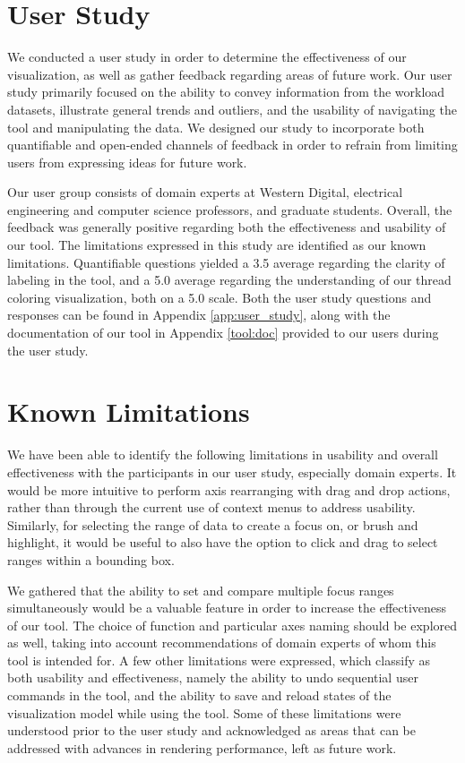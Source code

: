 \documentclass[12pt]{ucthesis}
\begin{document}
\section{User Study}
We conducted a user study in order to determine the effectiveness of our visualization, as well as gather feedback regarding areas of future work. Our user study primarily focused on the ability to convey information from the workload datasets, illustrate general trends and outliers, and the usability of navigating the tool and manipulating the data. We designed our study to incorporate both quantifiable and open-ended channels of feedback in order to refrain from limiting users from expressing ideas for future work.

Our user group consists of domain experts at Western Digital, electrical engineering and computer science professors, and graduate students. Overall, the feedback was generally positive regarding both the effectiveness and usability of our tool. The limitations expressed in this study are identified as our known limitations. Quantifiable questions yielded a 3.5 average regarding the clarity of labeling in the tool, and a 5.0 average regarding the understanding of our thread coloring visualization, both on a 5.0 scale. Both the user study questions and responses can be found in Appendix \ref{app:user_study}, along with the documentation of our tool in Appendix \ref{tool:doc} provided to our users during the user study.

\section{Known Limitations}
We have been able to identify the following limitations in usability and overall effectiveness with the participants in our user study, especially domain experts. It would be more intuitive to perform axis rearranging with drag and drop actions, rather than through the current use of context menus to address usability. Similarly, for selecting the range of data to create a focus on, or brush and highlight, it would be useful to also have the option to click and drag to select ranges within a bounding box.

We gathered that the ability to set and compare multiple focus ranges simultaneously would be a valuable feature in order to increase the effectiveness of our tool. The choice of function and particular axes naming should be explored as well, taking into account recommendations of domain experts of whom this tool is intended for. A few other limitations were expressed, which classify as both usability and effectiveness, namely the ability to undo sequential user commands in the tool, and the ability to save and reload states of the visualization model while using the tool. Some of these limitations were understood prior to the user study and acknowledged as areas that can be addressed with advances in rendering performance, left as future work. 
\end{document}
